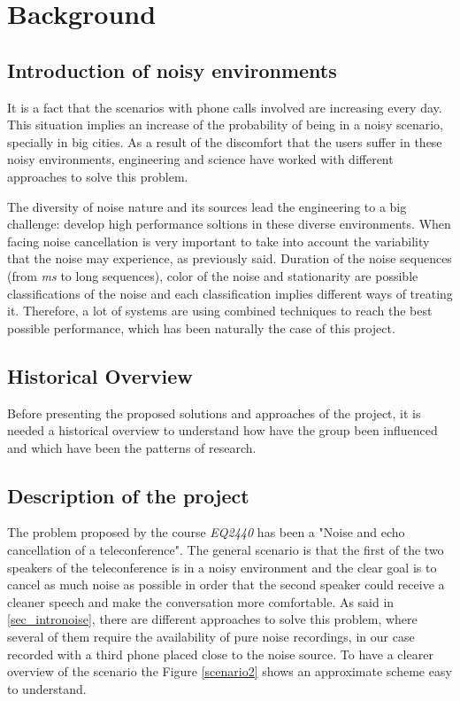 \documentclass[11pt,a4paper,english]{book}  %
\theoremstyle{definition}  %
\theoremstyle{plain}  %
\theoremstyle{remark}  %
\begin{document}
\pagebreak\tableofcontents
\pagebreak

\chapter{Background}

	\section{Introduction of noisy environments}
	\label{sec:intronoise}
	
It is a fact that the scenarios with phone calls involved are increasing every day. This situation implies an increase of the probability of being in a noisy scenario, specially in big cities. As a result of the discomfort that the users suffer in these noisy environments, engineering and science have worked with different approaches to solve this problem.

The diversity of noise nature and its sources lead the engineering to a big challenge: develop high performance soltions in these diverse environments. When facing noise cancellation is very important to take into account the variability that the noise may experience, as previously said. Duration of the noise sequences (from \textit{ms} to long sequences), color of the noise and stationarity are possible classifications of the noise and each classification implies different ways of treating it. Therefore, a lot of systems are using combined techniques to reach the best possible performance, which has been naturally the case of this project.

	\section{Historical Overview}
	\label{historya}
	Before presenting the proposed solutions and approaches of the project, it is needed a historical overview to understand how have the group been influenced and which have been the patterns of research.


	\section{Description of the project}
	\label{sec:introproblem}
	
	The problem proposed by the course \textit{EQ2440} has been a "Noise and echo cancellation of a teleconference". The general scenario is that the first of the two speakers of the teleconference is in a noisy environment and the clear goal is to cancel as much noise as possible in order that the second speaker could receive a cleaner speech and make the conversation more comfortable. As said in \ref{sec_intronoise}, there are different approaches to solve this problem, where several of them require the availability of pure noise recordings, in our case recorded with a third phone placed close to the noise source. To have a clearer overview of the scenario the Figure \ref{scenario2} shows an approximate scheme easy to understand.
	
\end{document}
